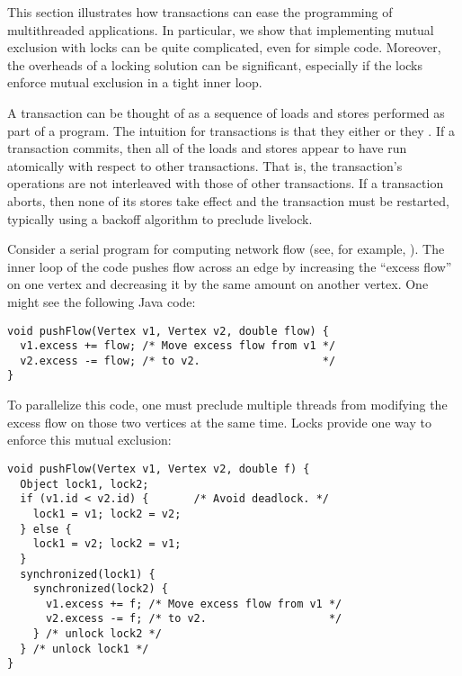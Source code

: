 \documentclass[preprint]{rdbacmconf}
\begin{document}
This section illustrates how transactions can ease
the programming of multithreaded applications.  In particular, we show
that implementing mutual exclusion with locks can be quite
complicated, even for simple code.  Moreover, the overheads of a
locking solution can be significant, especially if the locks enforce
mutual exclusion in a tight inner loop.

A transaction can be thought of as a sequence of loads and stores
performed as part of a program.  The intuition for transactions is
that they either  or they .  If a transaction
commits, then all of the loads and stores appear to have run
atomically with respect to other transactions.  That is, the
transaction's operations are not interleaved with those of other
transactions.  If a transaction aborts, then none of its stores take
effect and the transaction must be restarted, typically using a
backoff algorithm to preclude livelock.



Consider a serial program for computing network flow (see, for
example, \cite[Chapter 26]{CormenLeRi01}).  The inner loop of the code
pushes flow across an edge by increasing the ``excess flow'' on one
vertex and decreasing it by the same amount on another vertex.  One
might see the following Java code: \par {\footnotesize\samepage
\begin{verbatim}
void pushFlow(Vertex v1, Vertex v2, double flow) {
  v1.excess += flow; /* Move excess flow from v1 */
  v2.excess -= flow; /* to v2.                   */
}
\end{verbatim}
}

To parallelize this code, one must preclude multiple threads from
modifying the excess flow on those two vertices at the same time.
Locks provide one way to enforce this mutual exclusion: 
\par {\footnotesize\samepage
\begin{verbatim}
void pushFlow(Vertex v1, Vertex v2, double f) {
  Object lock1, lock2;
  if (v1.id < v2.id) {       /* Avoid deadlock. */
    lock1 = v1; lock2 = v2;
  } else {
    lock1 = v2; lock2 = v1;
  }
  synchronized(lock1) {
    synchronized(lock2) {
      v1.excess += f; /* Move excess flow from v1 */
      v2.excess -= f; /* to v2.                   */
    } /* unlock lock2 */
  } /* unlock lock1 */
}
\end{verbatim}
}
\end{document}
